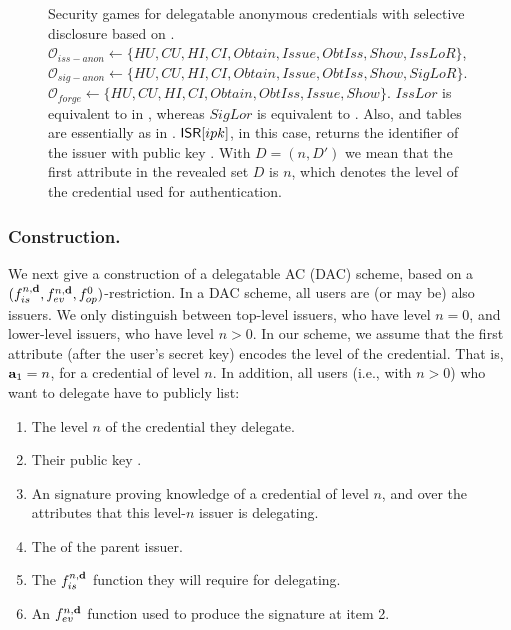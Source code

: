 \begin{figure}[ht!]
{  }
  \caption{Security games for delegatable anonymous credentials with selective
    disclosure based on \cite{fhs19}. $\mathcal{O}_{iss-anon} \gets \lbrace HU,
    CU,HI,CI,Obtain,Issue,ObtIss,Show,IssLoR\rbrace$, $\mathcal{O}_{sig-anon}
    \gets \lbrace HU,CU,HI,CI,Obtain,Issue,ObtIss,Show,SigLoR\rbrace$.
    $\mathcal{O}_{forge} \gets \lbrace HU,CU,HI,CI,Obtain,ObtIss,Issue,Show
    \rbrace$. $IssLor$ is equivalent to \OBTCHALb in \UAS, whereas $SigLor$ is
    equivalent to \CHALb. Also, \OWNR and \ATTR tables are essentially as in
    . $\mathsf{ISR}[ipk]$, in this case, returns the identifier
    of the issuer with public key \ipk. With $D =
    (n,D')$ we mean that the first attribute in the revealed set $D$ is $n$,
    which denotes the level of the credential used for authentication.}
  \label{fig:model-dac}  
\end{figure}

\subsubsection{\CUASDAC Construction.} %
We next give a construction of a delegatable AC (DAC) scheme, based on a
$(f_{is}^{n,\mathbf{d}},f_{ev}^{n,\mathbf{d}},f_{op}^0)$-\CUASGen restriction.
In a DAC scheme, all users are (or may be) also issuers. We only distinguish
between top-level issuers, who have level $n=0$, and lower-level issuers, who
have level $n>0$. In our \CUASDAC scheme, we assume that the first attribute
(after the user's secret key) encodes the level of the credential. That is,
$\mathbf{a}_1=n$, for a credential of level $n$. In addition, all users (i.e., with
$n>0$) who want to delegate have to publicly list:

\begin{enumerate}
\item The level $n$ of the credential they delegate.
\item Their public key \ipk.
\item An \UAS signature proving knowledge of a credential of level $n$, and over
  the attributes that this level-$n$ issuer is delegating.
\item The \ipk of the parent issuer.
\item The $f_{is}^{n,\mathbf{d}}$ function they will require for delegating.
\item An $f_{ev}^{n,\mathbf{d}}$ function used to produce the signature at item 2.
\end{enumerate}

